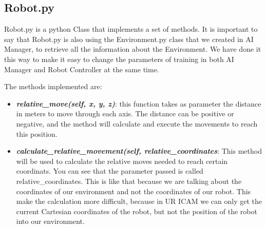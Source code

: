 	 	\subsection{Robot.py}
	 	
	 		Robot.py is a python Class that implements a set of methods. It is important to say that Robot.py is also using the Environment.py class that we created in AI Manager, to retrieve all the information about the Environment. We have done it this way to make it easy to change the parameters of training in both AI Manager and Robot Controller at the same time. 
	 		
	 		The methods implemented are:
	 		
	 		\begin{itemize}
	 			\item[\textendash]\textbf{\textit{relative\_move(self, x, y, z)}}: this function takes as parameter the distance in meters to move through each axis. The distance can be positive or negative, and the method will calculate and execute the movements to reach this position.
	 			\item[\textendash]\textbf{\textit{calculate\_relative\_movement(self, relative\_coordinates}}: This method will be used to calculate the relative moves needed to reach certain coordinats. You can see that the parameter passed is called relative\_coordinates. This is like that because we are talking about the coordinates of our environment and not the coordinates of our robot. This make the calculation more difficult, because in UR ICAM we can only get the current Cartesian coordinates of the robot, but not the position of the robot into our environment. 
	 			

\end{itemize}

